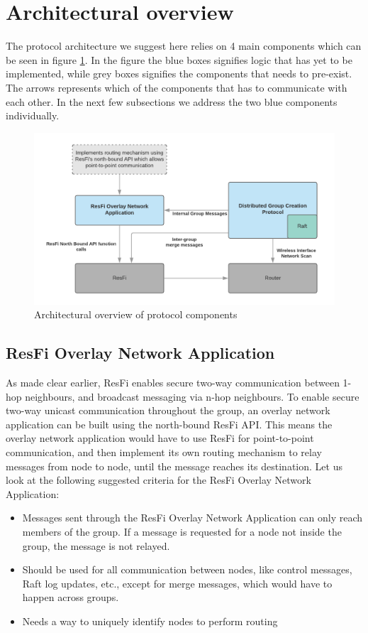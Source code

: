 \section{Architectural overview}
The protocol architecture we suggest here relies on 4 main components which can be seen in figure \ref{fig:dgcpoverview}.
In the figure the blue boxes signifies logic that has yet to be implemented, while grey boxes signifies the components that needs to pre-exist. The arrows
represents which of the components that has to communicate with each other. In the next few subsections we address the two blue components individually.

\begin{figure}
	\includegraphics[width=\textwidth]{Images/dgcpoverview.png}
		\caption{Architectural overview of protocol components }%
		\label{fig:dgcpoverview}%
\end{figure}


\subsection{ResFi Overlay Network Application}
As made clear earlier, ResFi enables secure two-way communication between 1-hop neighbours, and broadcast messaging via n-hop neighbours. 
To enable secure two-way unicast communication throughout the group, an overlay network application can be built using the north-bound ResFi API. 
This means the overlay network application would have to use ResFi for point-to-point communication, and then implement its own routing mechanism
to relay messages from node to node, until the message reaches its destination. Let us look at the following suggested criteria for the ResFi Overlay Network Application:

\begin{itemize}
	\item Messages sent through the ResFi Overlay Network Application can only reach members of the group. If a message is requested for a node not inside the group,
		the message is not relayed.
  \item Should be used for all communication between nodes, like control messages, Raft log updates, etc., except for merge messages, which would have to happen across
		groups. 
	\item Needs a way to uniquely identify nodes to perform routing
\end{itemize}


